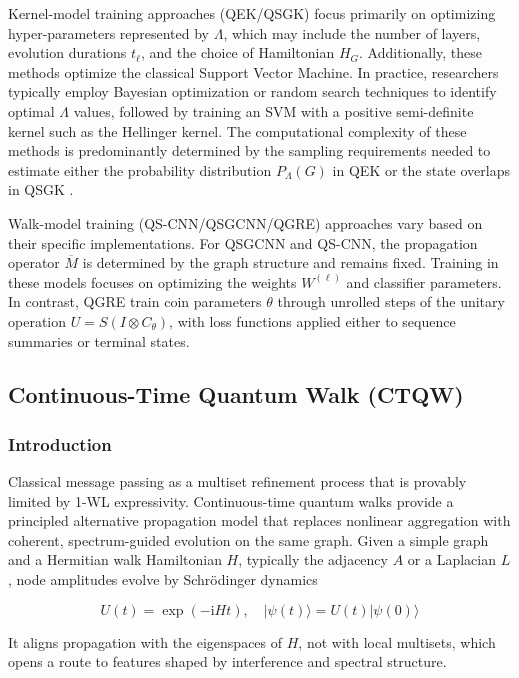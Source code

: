 \documentclass[11pt]{article}
\begin{document}
Kernel-model training approaches (QEK/QSGK) focus primarily on optimizing hyper-parameters represented by $\Lambda$, which may include the number of layers, evolution durations $t_\ell$, and the choice of Hamiltonian $H_G$. Additionally, these methods optimize the classical Support Vector Machine. In practice, researchers typically employ Bayesian optimization or random search techniques to identify optimal $\Lambda$ values, followed by training an SVM with a positive semi-definite kernel such as the Hellinger kernel. The computational complexity of these methods is predominantly determined by the sampling requirements needed to estimate either the probability distribution $P_\Lambda(G)$ in QEK \cite{henry2021quantum} or the state overlaps in QSGK \citep{kishi2021qsgk}.

Walk-model training (QS-CNN/QSGCNN/QGRE) \citep{bai2018qsgcnn,zhang2019qscnn,dernbach2019qw_feature_coin} approaches vary based on their specific implementations. For QSGCNN and QS-CNN, the propagation operator $\overline{M}$ is determined by the graph structure and remains fixed. Training in these models focuses on optimizing the weights $W^{(\ell)}$ and classifier parameters. In contrast, QGRE train coin parameters $\theta$ through unrolled steps of the unitary operation $U=S(I\!\otimes\!C_\theta)$, with loss functions applied either to sequence summaries or terminal states.

\subsection{Continuous-Time Quantum Walk (CTQW)}

\subsubsection{Introduction}

Classical message passing as a multiset refinement process that is provably limited by 1-WL expressivity. Continuous-time quantum walks \cite{herrman2019continuous} provide a principled alternative propagation model that replaces nonlinear aggregation with coherent, spectrum-guided evolution on the same graph. Given a simple graph and a Hermitian walk Hamiltonian $H$, typically the adjacency $A$ or a Laplacian $L$, node amplitudes evolve by Schr\"odinger dynamics

$$
U(t)=\exp (-\mathrm{i} H t), \quad |\psi(t)\rangle=U(t) |\psi(0)\rangle
$$

It aligns propagation with the eigenspaces of $H$, not with local multisets, which opens a route to features shaped by interference and spectral structure.
\end{document}
